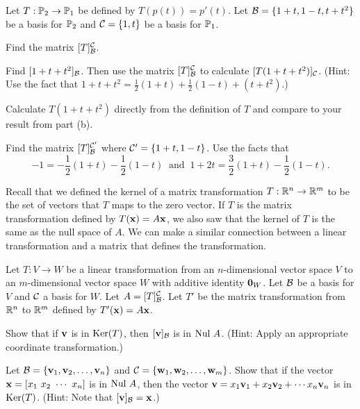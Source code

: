 \begin{activity} Let $T : \mathbb{P}_2 \to \mathbb{P}_1$ be defined by $T(p(t))= p'(t)$. Let $\mathcal{B} = \{1+t,1-t,t+t^2\}$ be a basis for $\mathbb{P}_2$ and $\mathcal{C} = \{1, t\}$ be a basis for $\mathbb{P}_1$. 
	\ba
	\item Find the matrix $[T]_{\mathcal{B}}^{\mathcal{C}}$.
	

	\item Find $[1+t+t^2]_{\mathcal{B}}$. Then use the matrix $[T]_{\mathcal{B}}^{\mathcal{C}}$ to calculate $[T(1+t+t^2)]_{\mathcal{C}}$. (Hint: Use the fact that $1+t+t^2 =\frac{1}{2}(1+t) + \frac{1}{2}(1-t) + (t+t^2)$.) 


	\item Calculate $T(1+t+t^2)$ directly from the definition of $T$ and compare to your result from part (b).

	\item Find the matrix $[T]_{\mathcal{B}}^{\mathcal{C}'}$ where $\mathcal{C}'=\{1+t, 1-t\}$. Use the facts that 
	\[-1 = -\frac{1}{2}(1+t) - \frac{1}{2}(1-t) \ \text{ and } \ 1+2t = \frac{3}{2}(1+t) - \frac{1}{2}(1-t).\]
	
	\ea 
\end{activity}

\label{sec:ker_mtx}

Recall that we defined the kernel of a matrix transformation $T: \mathbb{R}^n \to \mathbb{R}^m$ to be the set of vectors that $T$ maps to the zero vector. If $T$ is the matrix transformation defined by $T(\mathbf{x}) = A \mathbf{x}$, we also saw that the kernel of $T$ is the same as the null space of $A$. We can make a similar connection between a linear transformation and  a matrix that defines the transformation. 

\begin{activity} \label{act:8_b_kernel} Let $T : V \to W$ be a linear transformation from an $n$-dimensional vector space $V$ to an $m$-dimensional vector space $W$ with additive identity $\mathbf{0}_W$. Let $\mathcal{B}$ be a basis for $V$ and $\mathcal{C}$ a basis for $W$. Let $A = [T]_{\mathcal{B}}^{\mathcal{C}}$. Let $T'$ be the matrix transformation from $\mathbb{R}^n$ to $\mathbb{R}^m$ defined by $T'(\mathbf{x}) = A\mathbf{x}$. 
\ba
\item Show that if $\mathbf{v}$ is in $\text{Ker}(T)$, then $[\mathbf{v}]_{\mathcal{B}}$ is in $\text{Nul } A$. (Hint: Apply an appropriate coordinate transformation.) 


\item Let $\mathcal{B} = \{\mathbf{v}_1, \mathbf{v}_2, \ldots, \mathbf{v}_n\}$ and $\mathcal{C} = \{\mathbf{w}_1, \mathbf{w}_2, \ldots, \mathbf{w}_m\}$. Show that if the vector $\mathbf{x} = [x_1 \ x_2 \ \cdots \ x_n]$ is in $\text{Nul } A$, then the vector $\mathbf{v} = x_1\mathbf{v}_1 + x_2 \mathbf{v}_2 + \cdots x_n \mathbf{v}_n$ is in $\text{Ker}(T)$. (Hint: Note that $[\mathbf{v}]_{\mathcal{B}} = \mathbf{x}$.)

\ea

\end{activity}

